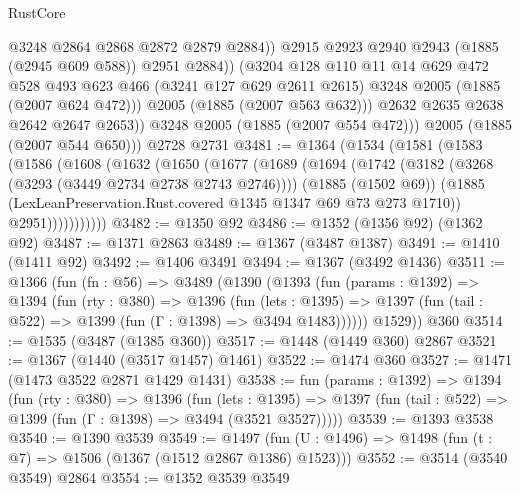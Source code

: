 \begin{lexlean}{RustCore}
\begin{coremodule}
                      @3248
                      @2864
                      @2868
                      @2872
                      @2879
                      @2884))
                  @2915
                  @2923
                  @2940
                  @2943
                  (@1885 (@2945 @609 @588))
                  @2951
                  @2884))
              (@3204
                @128
                @110
                @11
                @14
                @629
                @472
                @528
                @493
                @623
                @466
                (@3241 @127 @629 @2611 @2615)
                @3248
                @2005
                (@1885 (@2007 @624 @472)))
              @2005
              (@1885 (@2007 @563 @632)))
            @2632
            @2635
            @2638
            @2642
            @2647
            @2653))
        @3248
        @2005
        (@1885 (@2007 @554 @472)))
      @2005
      (@1885 (@2007 @544 @650)))
    @2728
    @2731
@3481 := @1364
    (@1534
      (@1581
        (@1583
          (@1586
            (@1608
              (@1632
                (@1650
                  (@1677
                    (@1689
                      (@1694
                        (@1742
                          (@3182 (@3268 (@3293 (@3449 @2734 @2738 @2743 @2746))))
                          (@1885 (@1502 @69))
                          (@1885 (LexLeanPreservation.Rust.covered @1345 @1347 @69 @73 @273 @1710))
                          @2951)))))))))))
@3482 := @1350 @92
@3486 := @1352 (@1356 @92) (@1362 @92)
@3487 := @1371 @2863
@3489 := @1367 (@3487 @1387)
@3491 := @1410 (@1411 @92)
@3492 := @1406 @3491
@3494 := @1367 (@3492 @1436)
@3511 := @1366
    (fun (fn : @56) =>
    @3489
      (@1390
        (@1393
          (fun (params : @1392) =>
          @1394
            (fun (rty : @380) =>
            @1396
              (fun (lets : @1395) =>
              @1397 (fun (tail : @522) => @1399 (fun (Γ : @1398) => @3494 @1483))))))
        @1529))
    @360
@3514 := @1535 (@3487 (@1385 @360))
@3517 := @1448 (@1449 @360) @2867
@3521 := @1367 (@1440 (@3517 @1457) @1461)
@3522 := @1474 @360
@3527 := @1471 (@1473 @3522 @2871 @1429 @1431)
@3538 := fun (params : @1392) =>
  @1394
    (fun (rty : @380) =>
    @1396
      (fun (lets : @1395) =>
      @1397 (fun (tail : @522) => @1399 (fun (Γ : @1398) => @3494 (@3521 @3527)))))
@3539 := @1393 @3538
@3540 := @1390 @3539
@3549 := @1497 (fun (U : @1496) => @1498 (fun (t : @7) => @1506 (@1367 (@1512 @2867 @1386) @1523)))
@3552 := @3514 (@3540 @3549) @2864
@3554 := @1352 @3539 @3549

\end{coremodule}
\end{lexlean}
